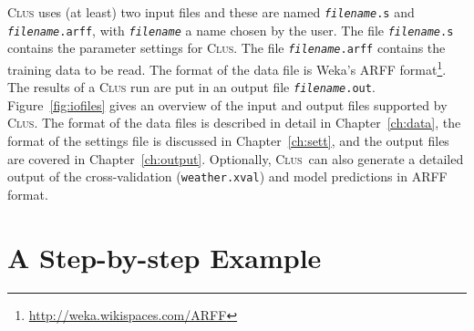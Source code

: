 \documentclass[a4paper]{report}
\newcommand{\clus}{\textsc{Clus}}
\begin{document}
\clus{} uses (at least) two input files and these are named {\tt {\em filename}.s} and {\tt {\em filename}.arff}, with {\tt {\em filename}} a name chosen by the user.  The file {\tt {\em filename}.s} contains the parameter settings for \clus{}. The file {\tt {\em filename}.arff} contains the training data to be read. The format of the data file is Weka's ARFF format\footnote{\url{http://weka.wikispaces.com/ARFF}}. The results of a \clus{} run are put in an output file {\tt {\em filename}.out}. Figure~\ref{fig:iofiles} gives an overview of the input and output files supported by \clus{}. The format of the data files is described in detail in Chapter~\ref{ch:data}, the format of the settings file is discussed in Chapter~\ref{ch:sett}, and the output files are covered in Chapter~\ref{ch:output}. Optionally, \clus\ can also generate a detailed output of the cross-validation (\texttt{weather.xval}) and model predictions in ARFF format.

\section{A Step-by-step Example}
\end{document}
